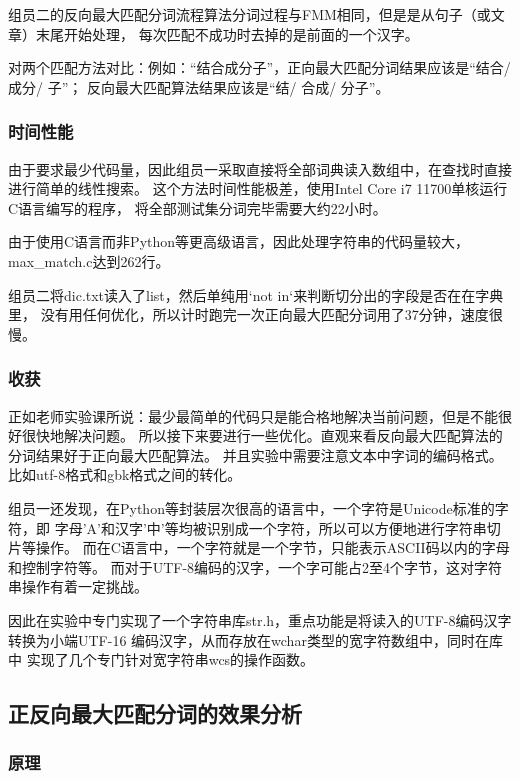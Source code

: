 组员二的反向最大匹配分词流程算法分词过程与FMM相同，但是是从句子（或文章）末尾开始处理，
每次匹配不成功时去掉的是前面的一个汉字。

对两个匹配方法对比：例如：“结合成分子”，正向最大匹配分词结果应该是“结合/ 成分/ 子”；
反向最大匹配算法结果应该是“结/ 合成/ 分子”。

\subsubsection{时间性能}

由于要求最少代码量，因此组员一采取直接将全部词典读入数组中，在查找时直接进行简单的线性搜索。
这个方法时间性能极差，使用Intel Core i7 11700单核运行C语言编写的程序，
将全部测试集分词完毕需要大约22小时。

由于使用C语言而非Python等更高级语言，因此处理字符串的代码量较大，max\_match.c达到262行。

组员二将dic.txt读入了list，然后单纯用`not in`来判断切分出的字段是否在在字典里，
没有用任何优化，所以计时跑完一次正向最大匹配分词用了37分钟，速度很慢。

\subsubsection{收获}

正如老师实验课所说：最少最简单的代码只是能合格地解决当前问题，但是不能很好很快地解决问题。
所以接下来要进行一些优化。直观来看反向最大匹配算法的分词结果好于正向最大匹配算法。
并且实验中需要注意文本中字词的编码格式。比如utf-8格式和gbk格式之间的转化。

组员一还发现，在Python等封装层次很高的语言中，一个字符是Unicode标准的字符，即
字母'A'和汉字'中'等均被识别成一个字符，所以可以方便地进行字符串切片等操作。
而在C语言中，一个字符就是一个字节，只能表示ASCII码以内的字母和控制字符等。
而对于UTF-8编码的汉字，一个字可能占2至4个字节，这对字符串操作有着一定挑战。

因此在实验中专门实现了一个字符串库str.h，重点功能是将读入的UTF-8编码汉字转换为小端UTF-16
编码\citep{garfinkel2013detecting}汉字，从而存放在wchar类型的宽字符数组中，同时在库中
实现了几个专门针对宽字符串wcs的操作函数。

\subsection{正反向最大匹配分词的效果分析}

\subsubsection{原理}

